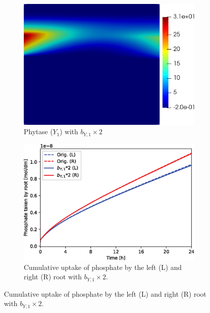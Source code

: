 \documentclass[11pt]{article}
\numberwithin{equation}{section}
\begin{document}
\begin{figure}[!htb]
\centering
\begin{subfigure}[t]{0.35\textwidth}
    \includegraphics[trim= 100 100 60 100,width=\textwidth]{Figures/Y1_bY1times2.png}
    \caption{Phytase ($Y_1$) with $b_{Y,1} \times 2$ }
    \label{fig:numexp_by1up1}
\end{subfigure}
\hspace{1cm}
\begin{subfigure}[t]{0.4\textwidth}
    \includegraphics[width=\textwidth]{Figures/bY1times2.eps}
    \caption{Cumulative uptake of phosphate by the left (L) and right (R) root with $b_{Y,1} \times 2$.}
    \label{fig:numexp_by1up2}
\end{subfigure}
\qquad


\end{figure}
\end{document}
